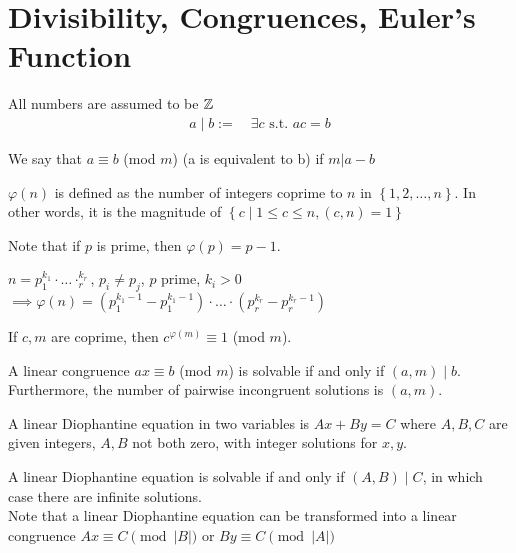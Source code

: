\documentclass{memoir}
\begin{document}
\chapter{Divisibility, Congruences, Euler's Function}
All numbers are assumed to be \(\mathbb{Z}\)\\
\begin{align*}
	a\mid b := \quad \exists c \text{ s.t. } ac = b
\end{align*}
\begin{defn}
	We say that \(a \equiv b\) (mod \(m\)) (a is equivalent to b)  if \(m|a-b\) 
\end{defn}
\begin{defn}
	\(\varphi(n)\) is defined as the number of integers coprime to \(n\) in \(\left\{ 1,2,\ldots,n \right\} \). In other words, it is the magnitude of \(\left\{ c \mid 1\leq c\leq n, (c,n) = 1 \right\} \)
\end{defn}
Note that if \(p\) is prime, then \(\varphi(p) = p-1\).
\begin{thm}
	\(n = p_1^{k_1}\cdot\ldots\cdotp_r^{k_r}\), \(p_i \neq p_j\), \(p\) prime, \(k_i > 0\) \(\implies \varphi(n) = (p_1^{k_1-1}-p_1^{k_1-1})\cdot\ldots\cdot (p_r^{k_r}-p_r^{k_r-1})\)
\end{thm}
\begin{thm}
	If \(c,m\) are coprime, then \(c^{\varphi(m)} \equiv 1\) (mod \(m\)).
\end{thm}
\begin{thm}
	A linear congruence \(ax \equiv b\) (mod \(m\)) is solvable if and only if \((a,m) \mid b\). Furthermore, the number of pairwise incongruent solutions is \((a,m)\).
\end{thm}
\begin{defn}
	A linear Diophantine equation in two variables is \(Ax+By=C\) where \(A,B,C\) are given integers, \(A,B\) not both zero, with integer solutions for  \(x,y \).
\end{defn}
A linear Diophantine equation is solvable if and only if \((A,B)\mid C\), in which case there are infinite solutions.\\
Note that a linear Diophantine equation can be transformed into a linear congruence \(Ax \equiv C \pmod {\left| B \right|}\) or \(By \equiv C \pmod {\left| A \right|} \)
\end{document}
